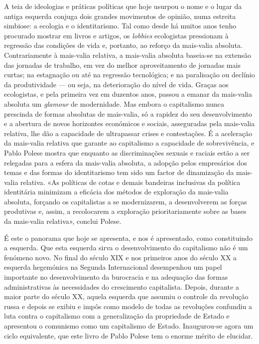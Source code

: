 A teia de ideologias e práticas políticas que hoje usurpou o nome e o
lugar da antiga esquerda conjuga dois grandes movimentos de opinião,
numa estreita simbiose: a ecologia e o identitarismo. Tal como desde há
muitos anos tenho procurado mostrar em livros e artigos, os
\emph{lobbies} ecologistas pressionam à regressão das condições de vida
e, portanto, ao reforço da mais-valia absoluta. Contrariamente à
mais-valia relativa, a mais-valia absoluta baseia-se na extensão das
jornadas de trabalho, em vez do melhor aproveitamento de jornadas mais
curtas; na estagnação ou até na regressão tecnológica; e na paralisação
ou declínio da produtividade --- ou seja, na deterioração do nível de
vida. Graças aos ecologistas, e pela primeira vez em duzentos anos,
passou a emanar da mais-valia absoluta um \emph{glamour} de modernidade.
Mas embora o capitalismo nunca prescinda de formas absolutas de
mais-valia, só a rapidez do seu desenvolvimento e a abertura de novos
horizontes económicos e sociais, asseguradas pela mais-valia relativa,
lhe dão a capacidade de ultrapassar crises e contestações. É a
aceleração da mais-valia relativa que garante ao capitalismo a
capacidade de sobrevivência, e Pablo Polese mostra que enquanto as
discriminações sexuais e raciais estão a ser relegadas para a esfera da
mais-valia absoluta, a adopção pelos empresários dos temas e das formas
do identitarismo tem sido um factor de dinamização da mais-valia
relativa. «As políticas de cotas e demais bandeiras inclusivas da
política identitária minimizam a eficácia dos métodos de exploração da
mais-valia absoluta, forçando os capitalistas a se modernizarem, a
desenvolverem as forças produtivas e, assim, a recolocarem a exploração
prioritariamente sobre as bases da mais-valia relativa», conclui Polese.

É este o panorama que hoje se apresenta, e nos é apresentado, como
constituindo a esquerda. Que esta esquerda sirva o desenvolvimento do
capitalismo não é um fenómeno novo. No final do século XIX e nos
primeiros anos do século XX a esquerda hegemónica na Segunda
Internacional desempenhou um papel importante no desenvolvimento da
burocracia e na adequação das formas administrativas às necessidades do
crescimento capitalista. Depois, durante a maior parte do século XX,
aquela esquerda que assumiu o controle da revolução russa e depois se
exibiu e impôs como modelo de todas as revoluções confundiu a luta
contra o capitalismo com a generalização da propriedade de Estado e
apresentou o comunismo como um capitalismo de Estado. Inaugurou-se agora
um ciclo equivalente, que este livro de Pablo Polese tem o enorme mérito
de elucidar.



